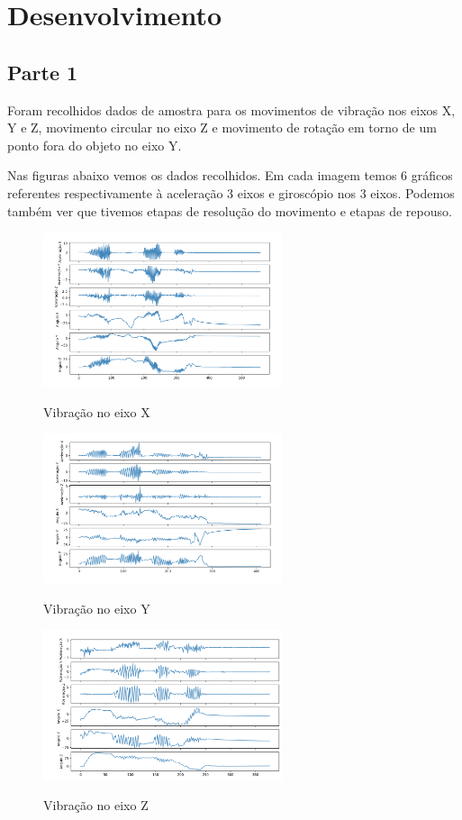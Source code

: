\section{Desenvolvimento}

\subsection*{Parte 1}

Foram recolhidos dados de amostra para os movimentos de vibração nos eixos X, Y e Z, movimento circular no eixo Z e movimento de rotação em torno de um ponto fora do objeto no eixo Y.

Nas figuras abaixo vemos os dados recolhidos. Em cada imagem temos 6 gráficos referentes respectivamente à aceleração 3 eixos e giroscópio nos 3 eixos.
Podemos também ver que tivemos etapas de resolução do movimento e etapas de repouso.


\begin{figure}[H]
    \center
    \includegraphics[width=7cm]{images/VibracaoX.png}
    \label{img6}
    \caption{Vibração no eixo X}
\end{figure}

\begin{figure}[H]
    \center
    \includegraphics[width=7cm]{images/VibracaoY.png}
    \label{img2}
    \caption{Vibração no eixo Y}
\end{figure}

\begin{figure}[H]
    \center
    \includegraphics[width=7cm]{images/VibracaoZ.png}
    \label{img3}
    \caption{Vibração no eixo Z}
\end{figure}

